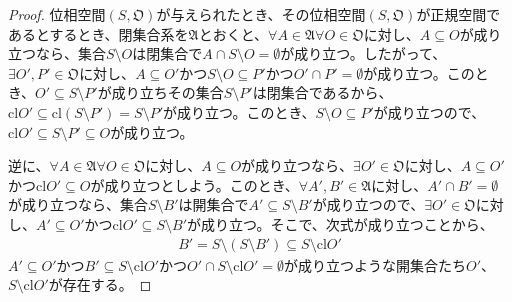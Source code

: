 \documentclass[dvipdfmx]{jsarticle}
\begin{document}
\begin{proof}
位相空間$\left( S,\mathfrak{O} \right)$が与えられたとき、その位相空間$\left( S,\mathfrak{O} \right)$が正規空間であるとするとき、閉集合系を$\mathfrak{A}$とおくと、$\forall A \in \mathfrak{A\forall}O \in \mathfrak{O}$に対し、$A \subseteq O$が成り立つなら、集合$S \setminus O$は閉集合で$A \cap S \setminus O = \emptyset$が成り立つ。したがって、$\exists O',P'\in \mathfrak{O}$に対し、$A \subseteq O'$かつ$S \setminus O \subseteq P'$かつ$O' \cap P' = \emptyset$が成り立つ。このとき、$O' \subseteq S \setminus P'$が成り立ちその集合$S \setminus P'$は閉集合であるから、${\mathrm{cl}}O' \subseteq {\mathrm{cl}}\left( S \setminus P' \right) = S \setminus P'$が成り立つ。このとき、$S \setminus O \subseteq P'$が成り立つので、${\mathrm{cl}}O' \subseteq S \setminus P' \subseteq O$が成り立つ。\par
逆に、$\forall A \in \mathfrak{A\forall}O \in \mathfrak{O}$に対し、$A \subseteq O$が成り立つなら、$\exists O'\in \mathfrak{O}$に対し、$A \subseteq O'$かつ${\mathrm{cl}}O' \subseteq O$が成り立つとしよう。このとき、$\forall A',B'\in \mathfrak{A}$に対し、$A' \cap B' = \emptyset$が成り立つなら、集合$S \setminus B'$は開集合で$A' \subseteq S \setminus B'$が成り立つので、$\exists O'\in \mathfrak{O}$に対し、$A' \subseteq O'$かつ${\mathrm{cl}}O' \subseteq S \setminus B'$が成り立つ。そこで、次式が成り立つことから、
\begin{align*}
B' = S \setminus \left( S \setminus B' \right) \subseteq S \setminus {\mathrm{cl}}O'
\end{align*}
$A' \subseteq O'$かつ$B' \subseteq S \setminus {\mathrm{cl}}O'$かつ$O' \cap S \setminus {\mathrm{cl}}O' = \emptyset$が成り立つような開集合たち$O'$、$S \setminus {\mathrm{cl}}O'$が存在する。
\end{proof}
\end{document}

